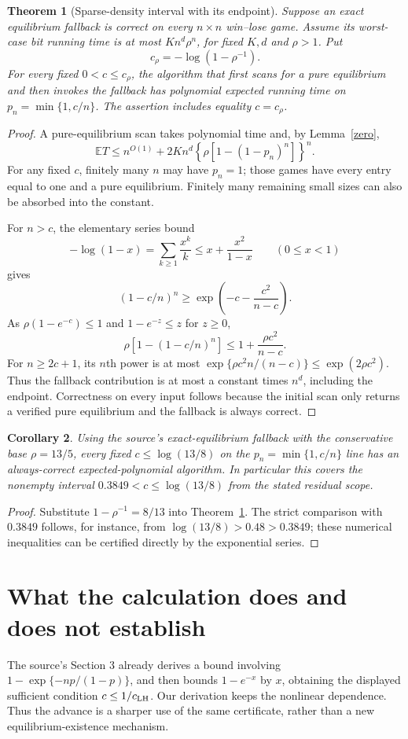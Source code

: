 \documentclass[11pt]{article}
\newtheorem{theorem}{Theorem}
\newtheorem{corollary}[theorem]{Corollary}
\theoremstyle{remark}
\newcommand{\E}{\mathbb E}
\begin{document}
\begin{theorem}[Sparse-density interval with its endpoint]\label{main}
Suppose an exact equilibrium fallback is correct on every $n\times n$ win--lose game. Assume its worst-case bit running time is at most $K n^d\rho^n$, for fixed $K,d$ and $\rho>1$. Put
\[
 c_\rho=-\log(1-\rho^{-1}).
\]
For every fixed $0<c\leq c_\rho$, the algorithm that first scans for a pure equilibrium and then invokes the fallback has polynomial expected running time on $p_n=\min\{1,c/n\}$. The assertion includes equality $c=c_\rho$.
\end{theorem}
\begin{proof}
A pure-equilibrium scan takes polynomial time and, by Lemma~\ref{zero},
\[
 \E T\leq n^{O(1)}+2Kn^d\left\{\rho[1-(1-p_n)^n]\right\}^{n}.
\]
For any fixed $c$, finitely many $n$ may have $p_n=1$; those games have every entry equal to one and a pure equilibrium. Finitely many remaining small sizes can also be absorbed into the constant.

For $n>c$, the elementary series bound
\[
 -\log(1-x)=\sum_{k\geq1}\frac{x^k}{k}
 \leq x+\frac{x^2}{1-x}\qquad(0\leq x<1)
\]
gives
\[
 (1-c/n)^n\geq\exp\left(-c-\frac{c^2}{n-c}\right).
\]
As $\rho(1-e^{-c})\leq1$ and $1-e^{-z}\leq z$ for $z\geq0$,
\[
 \rho[1-(1-c/n)^n]
 \leq1+\frac{\rho c^2}{n-c}.
\]
For $n\geq2c+1$, its $n$th power is at most
$\exp\{\rho c^2 n/(n-c)\}\leq\exp(2\rho c^2)$.
Thus the fallback contribution is at most a constant times $n^d$, including the endpoint. Correctness on every input follows because the initial scan only returns a verified pure equilibrium and the fallback is always correct.
\end{proof}

\begin{corollary}\label{numeric}
Using the source's exact-equilibrium fallback with the conservative base $\rho=13/5$, every fixed $c\leq\log(13/8)$ on the $p_n=\min\{1,c/n\}$ line has an always-correct expected-polynomial algorithm. In particular this covers the nonempty interval
$0.3849<c\leq\log(13/8)$ from the stated residual scope.
\end{corollary}
\begin{proof}
Substitute $1-\rho^{-1}=8/13$ into Theorem~\ref{main}. The strict comparison with $0.3849$ follows, for instance, from $\log(13/8)>0.48>0.3849$; these numerical inequalities can be certified directly by the exponential series.
\end{proof}

\section{What the calculation does and does not establish}
The source's Section 3 already derives a bound involving
$1-\exp\{-np/(1-p)\}$, and then bounds $1-e^{-x}$ by $x$, obtaining the displayed sufficient condition $c\leq1/c_{\rm LH}$. Our derivation keeps the nonlinear dependence. Thus the advance is a sharper use of the same certificate, rather than a new equilibrium-existence mechanism.
\end{document}
